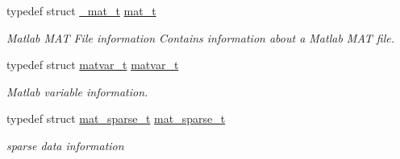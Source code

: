 \begin{DoxyCompactItemize}
\mbox{\label{group___m_a_t_gab0fc888f5a5d79943b16284b1f91c2e8}} 
typedef struct \hyperlink{struct__mat__t}{\+\_\+mat\+\_\+t} \hyperlink{group___m_a_t_gab0fc888f5a5d79943b16284b1f91c2e8}{mat\+\_\+t}
\begin{DoxyCompactList}\small\item\em Matlab M\+AT File information Contains information about a Matlab M\+AT file. \end{DoxyCompactList}\item 
typedef struct \hyperlink{group___m_a_t_structmatvar__t}{matvar\+\_\+t} \hyperlink{group___m_a_t_ga24775c96a2a6d073581639c780b7896c}{matvar\+\_\+t}
\begin{DoxyCompactList}\small\item\em Matlab variable information. \end{DoxyCompactList}\item 
typedef struct \hyperlink{group___m_a_t_structmat__sparse__t}{mat\+\_\+sparse\+\_\+t} \hyperlink{group___m_a_t_gad1332d0eb4faa5a99377919f84b77baf}{mat\+\_\+sparse\+\_\+t}
\begin{DoxyCompactList}\small\item\em sparse data information \end{DoxyCompactList}\end{DoxyCompactItemize}
